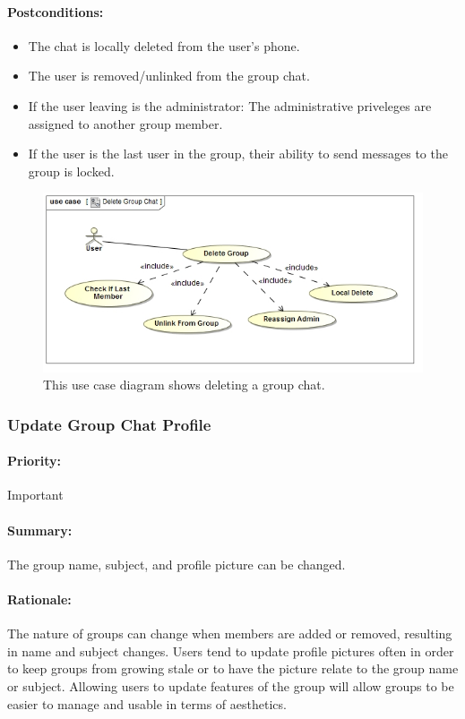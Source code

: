\documentclass[11pt]{article}
\begin{document}
\paragraph{{Postconditions:}} 
\begin{itemize}
	\item The chat is locally deleted from the user's phone.
	\item The user is removed/unlinked from the group chat.
	\item If the user leaving is the administrator: The administrative priveleges are assigned to another group member.
	\item If the user is the last user in the group, their ability to send messages to the group is locked.
\end{itemize}
\begin{figure}[H]
	\centering
\includegraphics[width=5in]{./images/UC_DeleteGroupChat.jpg}
\caption[Delete Group Chat Use Case Diagram]{This use case diagram shows deleting a group chat.}
\label{UC-figure-delete-group}
\end{figure}

\subsubsection{Update Group Chat Profile} \label{UC-update-group}
\paragraph{Priority:} Important
\paragraph{Summary:}
The group name, subject, and profile picture can be changed.
\paragraph{Rationale:}
The nature of groups can change when members are added or removed, resulting in name and subject changes. Users tend to update profile pictures often in order to keep groups from growing stale or to have the picture relate to the group name or subject. Allowing users to update features of the group will allow groups to be easier to manage and usable in terms of aesthetics.
\end{document}
